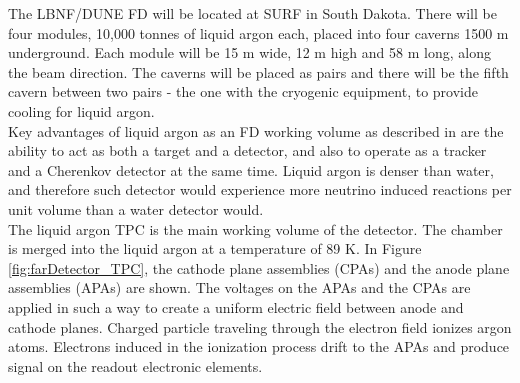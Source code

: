 The LBNF/DUNE FD will be located at SURF in South Dakota. There will be four modules, 10,000 tonnes of liquid argon each, placed into four caverns 1500 m underground. Each module will be 15 m wide, 12 m high and 58 m long, along the beam direction. The caverns will be placed as pairs and there will be the fifth cavern between two pairs - the one with the cryogenic equipment, to provide cooling for liquid argon.\\ 

Key advantages of liquid argon as an FD working volume as described in \cite{ref_aboutLAr} are the ability to act as both a target and a detector, and also to operate as a tracker and a Cherenkov detector at the same time. Liquid argon is denser than water, and therefore such detector would experience more neutrino induced reactions per unit volume than a water detector would. \\

The liquid argon TPC is the main working volume of the detector. The chamber is merged into the liquid argon at a temperature of 89 K. In Figure \ref{fig:farDetector_TPC}, the cathode plane assemblies (CPAs) and the anode plane assemblies (APAs) are shown. The voltages on the APAs and the CPAs are applied in such a way to create a uniform electric field between anode and cathode planes. Charged particle traveling through the electron field ionizes argon atoms. Electrons induced in the ionization process drift to the APAs and produce signal on the readout electronic elements.


